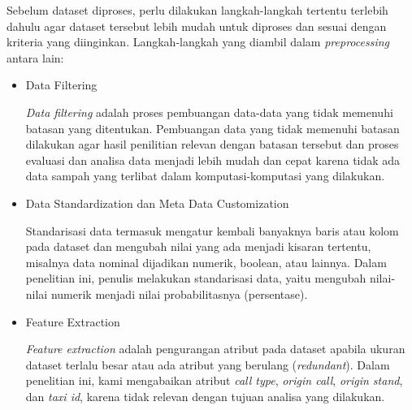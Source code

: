 \documentclass{article}
\begin{document}
\begin{adjustwidth}{4em}{0pt}

\hspace{\parindent}Sebelum dataset diproses, perlu dilakukan langkah-langkah tertentu terlebih dahulu agar dataset tersebut lebih mudah untuk diproses dan sesuai dengan kriteria yang diinginkan. Langkah-langkah yang diambil dalam \textit{preprocessing} antara lain:

\begin{itemize}
	\item{Data Filtering}
		
		\textit{Data filtering} adalah proses pembuangan data-data yang tidak memenuhi batasan yang ditentukan. Pembuangan data yang tidak memenuhi batasan dilakukan agar hasil penilitian relevan dengan batasan tersebut dan proses evaluasi dan analisa data menjadi lebih mudah dan cepat karena tidak ada data sampah yang terlibat dalam komputasi-komputasi yang dilakukan.
		
	\item{Data Standardization dan Meta Data Customization}
		
		Standarisasi data termasuk mengatur kembali banyaknya baris atau kolom pada dataset dan mengubah nilai yang ada menjadi kisaran tertentu, misalnya data nominal dijadikan numerik, boolean, atau lainnya. Dalam penelitian ini, penulis melakukan standarisasi data, yaitu mengubah nilai-nilai numerik menjadi nilai probabilitasnya (persentase).
		
	\item{Feature Extraction}
		
		\textit{Feature extraction} adalah pengurangan atribut pada dataset apabila ukuran dataset terlalu besar atau ada atribut yang berulang (\textit{redundant}). Dalam penelitian ini, kami mengabaikan atribut \textit{call type}, \textit{origin call}, \textit{origin stand}, dan \textit{taxi id}, karena tidak relevan dengan tujuan analisa yang dilakukan.
		
\end{itemize}

\end{adjustwidth}
\end{document}
